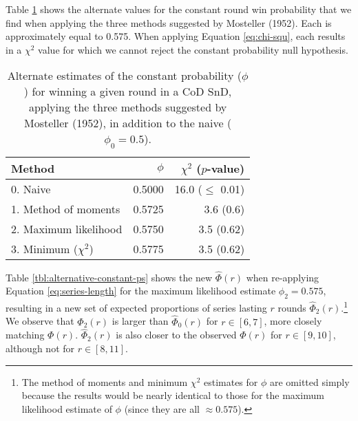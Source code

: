 \documentclass{article}
\begin{document}
Table \ref{tbl:mosteller-methods-results} shows the alternate values for
the constant round win probability that we find when applying the three
methods suggested by Mosteller (1952). Each is approximately equal to
0.575. When applying Equation \ref{eq:chi-squ}, each results in a
\(\chi^2\) value for which we cannot reject the constant probability
null hypothesis.

\begin{table}

\caption{Alternate estimates of the constant probability ($\phi$) for winning a given round in a CoD SnD, applying the three methods suggested by Mosteller (1952), in addition to the naive ($\phi_0 = 0.5$).}

\centering
\begin{tabular}{lrr}
\toprule
Method & $\phi$ & $\chi^2$ ($p$-value) \\
\midrule

0. Naive & 0.5000 & 16.0 ($\leq$ 0.01) \\
1. Method of moments & 0.5725 & 3.6 (0.6) \\
2. Maximum likelihood & 0.5750 & 3.5 (0.62) \\
3. Minimum ($\chi^2$) & 0.5775 & 3.5 (0.62) \\

\bottomrule
\end{tabular}

\label{tbl:mosteller-methods-results}

\end{table}

Table \ref{tbl:alternative-constant-ps} shows the new \(\hat{\Phi}(r)\)
when re-applying Equation \ref{eq:series-length} for the maximum
likelihood estimate \(\phi_2 = 0.575\), resulting in a new set of
expected proportions of series lasting \(r\) rounds
\(\hat{\Phi}_2(r)\).\footnote{The method of moments and minimum
  \(\chi^2\) estimates for \(\phi\) are omitted simply because the
  results would be nearly identical to those for the maximum likelihood
  estimate of \(\phi\) (since they are all \(\approx 0.575\)).} We
observe that \(\hat{\Phi}_2(r)\) is larger than \(\hat{\Phi}_0(r)\) for
\(r \in [6, 7]\), more closely matching \(\Phi(r)\). \(\hat{\Phi}_2(r)\)
is also closer to the observed \(\Phi(r)\) for \(r \in [9, 10]\),
although not for \(r \in [8, 11]\).
\end{document}
